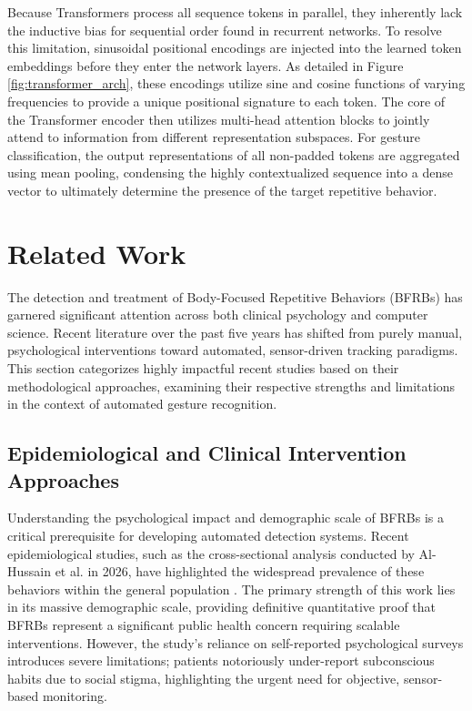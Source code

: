 \documentclass[conference]{IEEEtran}
\begin{document}
Because Transformers process all sequence tokens in parallel, they inherently lack the inductive bias for sequential order found in recurrent networks. To resolve this limitation, sinusoidal positional encodings are injected into the learned token embeddings before they enter the network layers. As detailed in Figure \ref{fig:transformer_arch}, these encodings utilize sine and cosine functions of varying frequencies to provide a unique positional signature to each token. The core of the Transformer encoder then utilizes multi-head attention blocks to jointly attend to information from different representation subspaces. For gesture classification, the output representations of all non-padded tokens are aggregated using mean pooling, condensing the highly contextualized sequence into a dense vector to ultimately determine the presence of the target repetitive behavior.

\clearpage

\newpage
\section{Related Work}
\label{sec:related_work}

The detection and treatment of Body-Focused Repetitive Behaviors (BFRBs) has garnered significant attention across both clinical psychology and computer science. Recent literature over the past five years has shifted from purely manual, psychological interventions toward automated, sensor-driven tracking paradigms. This section categorizes highly impactful recent studies based on their methodological approaches, examining their respective strengths and limitations in the context of automated gesture recognition.

\subsection{Epidemiological and Clinical Intervention Approaches}
Understanding the psychological impact and demographic scale of BFRBs is a critical prerequisite for developing automated detection systems. Recent epidemiological studies, such as the cross-sectional analysis conducted by Al-Hussain et al. in 2026, have highlighted the widespread prevalence of these behaviors within the general population \cite{alhussain2026prevalence}. The primary strength of this work lies in its massive demographic scale, providing definitive quantitative proof that BFRBs represent a significant public health concern requiring scalable interventions. However, the study's reliance on self-reported psychological surveys introduces severe limitations; patients notoriously under-report subconscious habits due to social stigma, highlighting the urgent need for objective, sensor-based monitoring.
\end{document}
